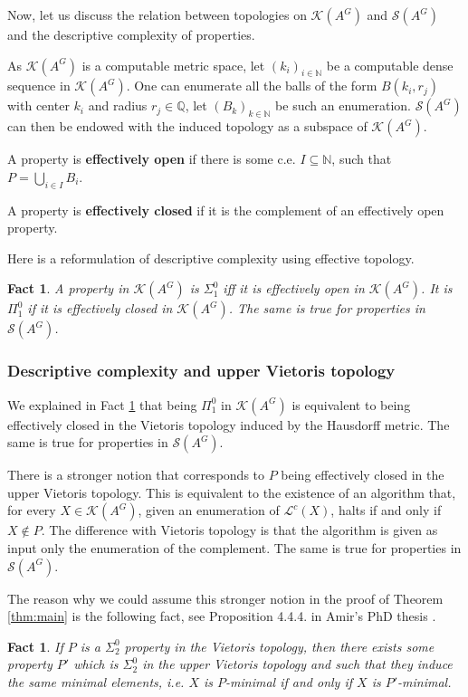 \documentclass[french,american]{article}
\theoremstyle{plain}
\theoremstyle{definition}
\theoremstyle{remark}
\theoremstyle{plain}
\newtheorem{fact}[theorem]{Fact}
\begin{document}
Now, let us discuss the relation between topologies on $\mathcal{K}(A^{G})$
and $\mathcal{S}(A^{G})$ and the descriptive complexity of properties.

As $\mathcal{K}(A^{G})$ is a computable metric space, let $(k_{i})_{i\in\mathbb{N}}$
be a computable dense sequence in $\mathcal{K}(A^{G})$. One can enumerate
all the balls of the form $B(k_{i},r_{j})$ with center $k_{i}$ and
radius $r_{j}\in\mathbb{Q}$, let $(B_{k})_{k\in\mathbb{\mathbb{N}}}$
be such an enumeration. $\mathcal{S}(A^{G})$ can then be endowed with
the induced topology as a subspace of $\mathcal{K}(A^{G})$.

A property is \textbf{effectively open} if there is some c.e. $I\subseteq\mathbb{N}$,
such that $P=\bigcup_{i\in I}B_{i}$.

A property is \textbf{effectively closed} if it is the complement
of an effectively open property.

Here is a reformulation of descriptive complexity using effective
topology.
\begin{fact}
\label{fact:effclo<>p01}A property in
$\mathcal{K}(A^{G})$ is $\Sigma_{1}^{0}$ iff it is effectively open
in $\mathcal{K}(A^{G})$. It is $\Pi_{1}^{0}$ if it is effectively
closed in $\mathcal{K}(A^{G})$. The same is true for properties in $\mathcal{S}(A^{G})$.
\end{fact}

\subsubsection{Descriptive complexity and upper Vietoris topology}\label{subsec:Another-definition-of}

We explained in Fact \ref{fact:effclo<>p01}
that being $\Pi_{1}^{0}$ in $\mathcal{K}(A^{G})$ is equivalent to
being effectively closed in the Vietoris topology induced by the Hausdorff
metric. The same is true for properties
in $\mathcal{S}(A^{G})$.

There is a stronger notion that corresponds to $P$ being effectively closed in the upper Vietoris topology.
This is equivalent to the existence of an algorithm that, for
every $X\in\mathcal{K}(A^{G})$, given an enumeration
of $\mathcal{L}^{c}(X)$, halts if and only if $X\notin P$. The difference with Vietoris topology is that the algorithm is given as input only the enumeration of the complement.
The same is true for properties in $\mathcal{S}(A^{G})$.

The reason why we could assume this stronger notion in the proof of Theorem \ref{thm:main}
is the following fact, see Proposition 4.4.4. in Amir's PhD thesis
\cite{Phdamir2024}. 
\begin{fact}
\label{fact:PinV<>PinupV}If
$P$ is a $\Sigma_{2}^{0}$ property in the Vietoris topology, then
there exists some property $P'$ which is $\Sigma_{2}^{0}$ in the
upper Vietoris topology and such that they induce the same minimal
elements, i.e. $X$ is $P$-minimal if and only if $X$ is $P'$-minimal.
\end{fact}
\end{document}
